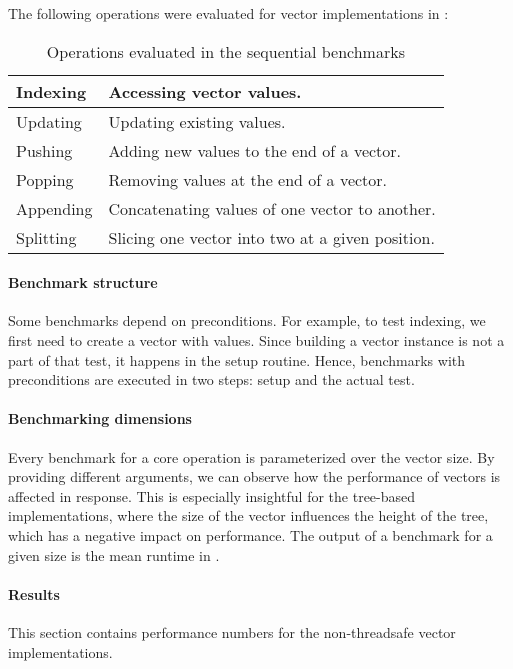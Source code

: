 The following operations were evaluated for vector implementations in :
\begin{table}[!htbp]
    \centering

    \begin{tabular} { |l| p{10cm} | }
        \hline
        Indexing & Accessing vector values. \\ \hline
        Updating & Updating existing values. \\ \hline
        Pushing & Adding new values to the end of a vector. \\ \hline
        Popping & Removing values at the end of a vector. \\ \hline
        Appending & Concatenating values of one vector to another. \\ \hline
        Splitting & Slicing one vector into two at a given position. \\ \hline
    \end{tabular}

    \label{tab:operations-sequential-benchmarks}
    \caption{Operations evaluated in the sequential benchmarks}
\end{table}

\paragraph{Benchmark structure}
Some benchmarks depend on preconditions. For example, to test indexing, we first need to create a vector with values. Since building a vector instance is not a part of that test, it happens in the setup routine. Hence, benchmarks with preconditions are executed in two steps: setup and the actual test.

\paragraph{Benchmarking dimensions}
Every benchmark for a core operation is parameterized over the vector size. By providing different arguments, we can observe how the performance of vectors is affected in response. This is especially insightful for the tree-based implementations, where the size of the vector influences the height of the tree, which has a negative impact on performance. The output of a benchmark for a given size is the mean runtime in \millis{}.

\paragraph{Results}
This section contains performance numbers for the non-threadsafe vector implementations.


